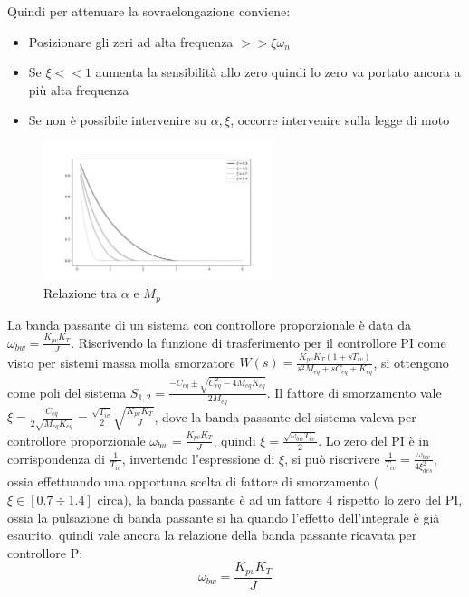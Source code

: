 Quindi per attenuare la sovraelongazione conviene:
\begin{itemize}
    \item Posizionare gli zeri ad alta frequenza \(>> \xi \omega_n\)
    \item Se \(\xi << 1\) aumenta la sensibilità allo zero quindi lo zero va portato ancora  a più alta frequenza
    \item Se non è possibile intervenire su \(\alpha, \xi\), occorre intervenire sulla legge di moto
\end{itemize}

\begin{figure}[h]
    \centering
    \includegraphics[width=0.6\textwidth]{Immagini/relazione_sovraelongazione.png}
    \caption{Relazione tra \(\alpha\) e \(M_p\)}
\end{figure}

La banda passante di un sistema con controllore proporzionale è data da \(\omega_{bw}=\frac{K_{pv}K_T}{J}\).
Riscrivendo la funzione di trasferimento per il controllore PI come visto per sistemi massa molla smorzatore \(W(s)=\frac{K_{pv}K_T(1+sT_{iv})}{s^2M_{eq} + s C_{eq} + K_{eq}}\), si ottengono come poli del sistema \(S_{1,2}=\frac{-C_{eq}\pm\sqrt{C_{eq}^2-4M_{eq}K_{eq}}}{2M_{eq}}\). Il fattore di smorzamento vale \(\xi = \frac{C_{eq}}{2\sqrt{M_{eq}K_{eq}}}=\frac{\sqrt{T_{iv}}}{2}\sqrt{\frac{K_{pv}K_T}{J}}\), dove la banda passante del sistema valeva per controllore proporzionale \(\omega_{bw}=\frac{K_{pv}K_T}{J}\), quindi \(\xi=\frac{\sqrt{\omega_{bw}T_{iv}}}{2}\).
Lo zero del PI è in corrispondenza di \(\frac{1}{T_{iv}}\), invertendo l'espressione di \(\xi\), si può riscrivere \(\frac{1}{T_{iv}} = \frac{\omega_{bw}}{4\xi^2_{des}}\), ossia effettuando una opportuna scelta di fattore di smorzamento (\(\xi \in [0.7\div 1.4]\)  circa), la banda passante è ad un fattore 4 rispetto lo zero del PI, ossia la pulsazione di banda passante si ha quando l'effetto dell'integrale è già esaurito, quindi vale ancora la relazione della banda passante ricavata per controllore P:
\[\omega_{bw}=\frac{K_{pv}K_T}{J}\]

